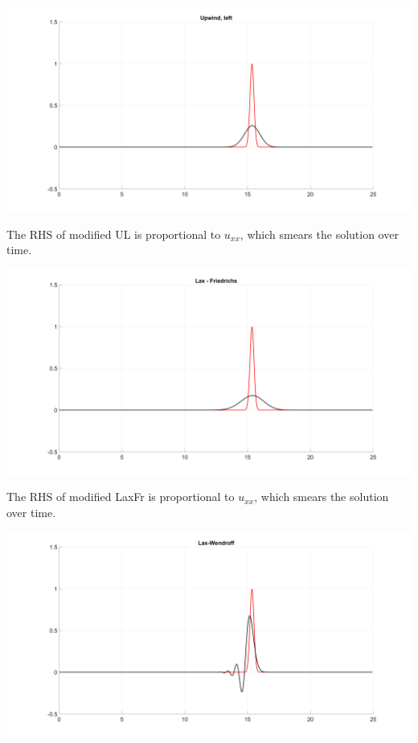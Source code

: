 \documentclass{article}
\begin{document}
\begin{enumerate}
\begin{enumerate}
\begin{enumerate}
		\begin{center}
			\includegraphics[scale=.18]{hw11 UL}
		\end{center}
		The RHS of modified UL is proportional to $u_{xx}$, which smears the solution over time.
		\begin{center}
			\includegraphics[scale=.18]{hw11 LaxFr}
		\end{center}
		The RHS of modified LaxFr is proportional to $u_{xx}$, which smears the solution over time.
		\begin{center}
			\includegraphics[scale=.18]{hw11 LW}
		\end{center}

\end{enumerate}
\end{enumerate}
\end{enumerate}
\end{document}
